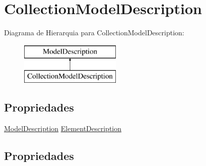 \hypertarget{classApi3Layers_1_1Areas_1_1HelpPage_1_1ModelDescriptions_1_1CollectionModelDescription}{}\section{Collection\+Model\+Description}
\label{classApi3Layers_1_1Areas_1_1HelpPage_1_1ModelDescriptions_1_1CollectionModelDescription}
Diagrama de Hierarquia para Collection\+Model\+Description\+:\begin{figure}[H]
\begin{center}
\leavevmode
\includegraphics[height=2.000000cm]{d5/dbc/classApi3Layers_1_1Areas_1_1HelpPage_1_1ModelDescriptions_1_1CollectionModelDescription}
\end{center}
\end{figure}
\subsection*{Propriedades}
\begin{DoxyCompactItemize}
\item 
\hyperlink{classApi3Layers_1_1Areas_1_1HelpPage_1_1ModelDescriptions_1_1ModelDescription}{Model\+Description} \hyperlink{classApi3Layers_1_1Areas_1_1HelpPage_1_1ModelDescriptions_1_1CollectionModelDescription_a631f3e871530b1038022867696e8c7a9}{Element\+Description}
\end{DoxyCompactItemize}


\subsection{Propriedades}
\mbox{\label{classApi3Layers_1_1Areas_1_1HelpPage_1_1ModelDescriptions_1_1CollectionModelDescription_a631f3e871530b1038022867696e8c7a9}} 
